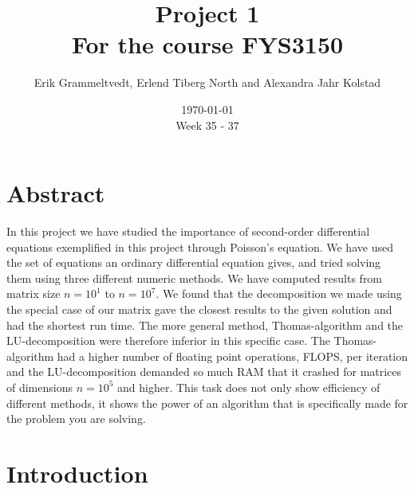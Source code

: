 \documentclass{article}
\begin{document}
\addtocounter{page}{0}

\title{Project 1 \\
      \large For the course FYS3150}
\date{\today \\
    \vspace{1mm}
    \large Week 35 - 37}

\author{Erik Grammeltvedt, Erlend Tiberg North and Alexandra Jahr Kolstad}

\maketitle

\vspace{1cm}

\tableofcontents

\vspace{1cm}



\section{Abstract} \label{sec:Abstract}

In this project we have studied the importance of second-order differential equations exemplified in this project through Poisson’s equation. We have used the set of equations an ordinary differential equation gives, and tried solving them using three different numeric methods. We have computed results from matrix size $n = 10^1$ to $n = 10^7$. We found that the decomposition we made using the special case of our matrix gave the closest results to the given solution and had the shortest run time. The more general method, Thomas-algorithm and the LU-decomposition were therefore inferior in this specific case. The Thomas-algorithm had a higher number of floating point operations, FLOPS, per iteration and the LU-decomposition demanded so much RAM that it crashed for matrices of dimensions $n = 10^5$ and higher. This task does not only show efficiency of different methods, it shows the power of an algorithm that is specifically made for the problem you are solving.


\vspace{1cm}

\section{Introduction} \label{sec:Introduction}
\end{document}
